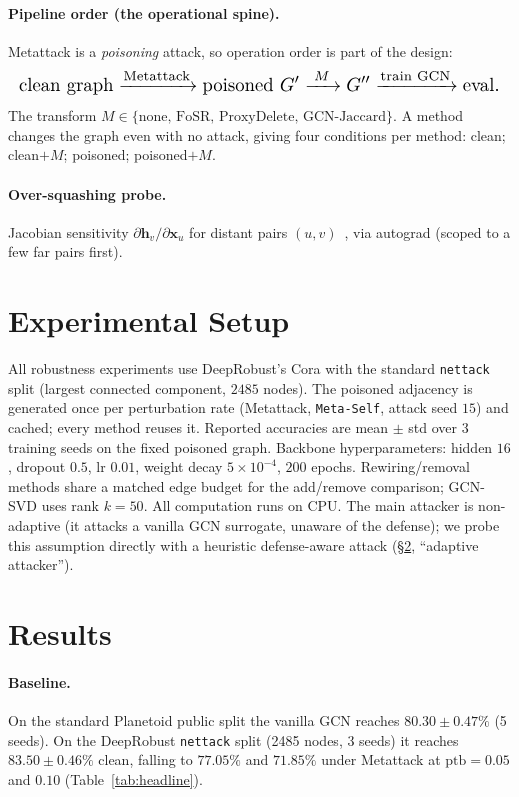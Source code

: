 \documentclass[11pt]{article}
\begin{document}
\paragraph{Pipeline order (the operational spine).} Metattack is a \emph{poisoning} attack, so operation
order is part of the design:
\[
\resizebox{\columnwidth}{!}{$\displaystyle
\text{clean graph} \xrightarrow{\text{Metattack}} \text{poisoned } G'
\xrightarrow{\;M\;} G'' \xrightarrow{\text{train GCN}} \text{eval}.$}
\]
The transform $M \in \{\text{none, FoSR, ProxyDelete, GCN-Jaccard}\}$. A method changes the graph even with
no attack, giving four conditions per method: clean; clean${+}M$; poisoned; poisoned${+}M$.

\paragraph{Over-squashing probe.} Jacobian sensitivity $\partial \mathbf{h}_v / \partial \mathbf{x}_u$ for
distant pairs $(u,v)$~\citep{digiovanni2023oversquashing}, via autograd (scoped to a few far pairs first).

\section{Experimental Setup}
All robustness experiments use DeepRobust's Cora with the standard \texttt{nettack} split (largest connected
component, $2485$ nodes). The poisoned adjacency is generated once per perturbation rate (Metattack,
\texttt{Meta-Self}, attack seed $15$) and cached; every method reuses it. Reported accuracies are mean $\pm$
std over $3$ training seeds on the fixed poisoned graph. Backbone hyperparameters: hidden $16$, dropout
$0.5$, lr $0.01$, weight decay $5\!\times\!10^{-4}$, $200$ epochs. Rewiring/removal methods share a matched
edge budget for the add/remove comparison; GCN-SVD uses rank $k{=}50$. All computation runs on CPU.
The main attacker is non-adaptive (it attacks a vanilla GCN surrogate, unaware of the defense); we probe
this assumption directly with a heuristic defense-aware attack (\S\ref{sec:results}, ``adaptive attacker'').

\section{Results}\label{sec:results}
\paragraph{Baseline.} On the standard Planetoid public split the vanilla GCN reaches $80.30 \pm 0.47\%$
(5 seeds). On the DeepRobust \texttt{nettack} split (2485 nodes, 3 seeds) it reaches $83.50 \pm 0.46\%$
clean, falling to $77.05\%$ and $71.85\%$ under Metattack at $\text{ptb}=0.05$ and $0.10$
(Table~\ref{tab:headline}).
\end{document}
